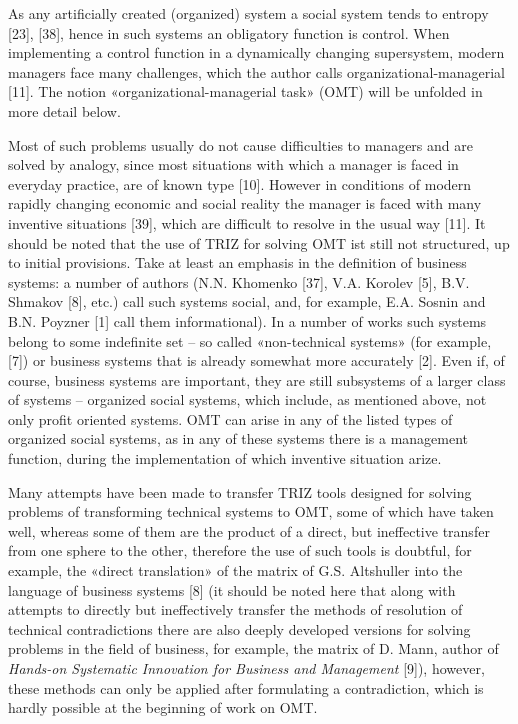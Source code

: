 \documentclass[11pt,a4paper]{book}
\begin{document}
As any artificially created (organized) system a social system tends to
entropy [23], [38], hence in such systems an obligatory function is control.
When implementing a control function in a dynamically changing supersystem,
modern managers face many challenges, which the author calls
organizational-managerial [11]. The notion «organizational-managerial task»
(OMT) will be unfolded in more detail below.

Most of such problems usually do not cause difficulties to managers and are
solved by analogy, since most situations with which a manager is faced in
everyday practice, are of known type [10]. However in conditions of modern
rapidly changing economic and social reality the manager is faced with many
inventive situations [39], which are difficult to resolve in the usual way
[11].  It should be noted that the use of TRIZ for solving OMT ist still not
structured, up to initial provisions. Take at least an emphasis in the
definition of business systems: a number of authors (N.N. Khomenko [37],
V.A. Korolev [5], B.V. Shmakov [8], etc.) call such systems social, and, for
example, E.A. Sosnin and B.N. Poyzner [1] call them informational).  In a
number of works such systems belong to some indefinite set -- so called
«non-technical systems» (for example, [7]) or business systems that is already
somewhat more accurately [2]. Even if, of course, business systems are
important, they are still subsystems of a larger class of systems -- organized
social systems, which include, as mentioned above, not only profit oriented
systems. OMT can arise in any of the listed types of organized social systems,
as in any of these systems there is a management function, during the
implementation of which inventive situation arize.

Many attempts have been made to transfer TRIZ tools designed for solving
problems of transforming technical systems to OMT, some of which have taken
well, whereas some of them are the product of a direct, but ineffective
transfer from one sphere to the other, therefore the use of such tools is
doubtful, for example, the «direct translation» of the matrix of
G.S. Altshuller into the language of business systems [8] (it should be noted
here that along with attempts to directly but ineffectively transfer the
methods of resolution of technical contradictions there are also deeply
developed versions for solving problems in the field of business, for example,
the matrix of D. Mann, author of \emph{Hands-on Systematic Innovation for
  Business and Management} [9]), however, these methods can only be applied
after formulating a contradiction, which is hardly possible at the beginning
of work on OMT.
\end{document}
